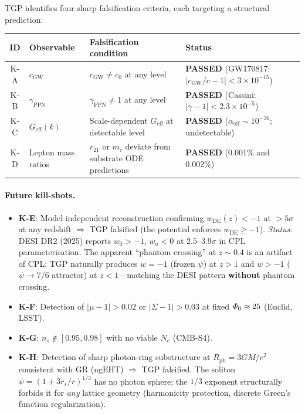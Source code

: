 TGP identifies four sharp falsification criteria, each targeting
a structural prediction:

\begin{center}\small
\begin{tabular}{@{}clp{5.5cm}l@{}}
\toprule
\textbf{ID} & \textbf{Observable} & \textbf{Falsification condition} &
\textbf{Status} \\
\midrule
K-A & $c_{\mathrm{GW}}$
  & $c_{\mathrm{GW}} \neq c_{0}$ at any level
  & \textbf{PASSED} (GW170817: $|c_{\mathrm{GW}}/c-1|<3\times 10^{-15}$) \\[4pt]
K-B & $\gamma_{\mathrm{PPN}}$
  & $\gamma_{\mathrm{PPN}} \neq 1$ at any level
  & \textbf{PASSED} (Cassini: $|\gamma-1|<2.3\times 10^{-5}$) \\[4pt]
K-C & $G_{\mathrm{eff}}(k)$
  & Scale-dependent $G_{\mathrm{eff}}$ at detectable level
  & \textbf{PASSED} ($\alpha_{\mathrm{eff}}\sim 10^{-26}$; undetectable) \\[4pt]
K-D & Lepton mass ratios
  & $r_{21}$ or $m_{\tau}$ deviate from substrate ODE predictions
  & \textbf{PASSED} (0.001\% and 0.002\%) \\
\bottomrule
\end{tabular}
\end{center}

\paragraph{Future kill-shots.}
\begin{itemize}[nosep]
  \item \textbf{K-E}: Model-independent reconstruction confirming
        $w_{\mathrm{DE}}(z)<-1$ at $>5\sigma$ at any redshift
        $\Rightarrow$ TGP falsified
        (the potential enforces $w_{\mathrm{DE}}\geq -1$).
        \emph{Status}: DESI DR2 (2025) reports $w_0 > -1$,
        $w_a < 0$ at $2.5$--$3.9\sigma$ in CPL parameterisation.
        The apparent ``phantom crossing'' at $z \sim 0.4$ is
        an artifact of CPL: TGP naturally produces $w = -1$
        (frozen $\psi$) at $z > 1$ and $w > -1$ ($\psi \to 7/6$
        attractor) at $z < 1$---matching the DESI pattern
        \textbf{without} phantom crossing.
  \item \textbf{K-F}: Detection of $|\mu-1|>0.02$ or
        $|\Sigma-1|>0.03$ at fixed $\varPhi_0\approx 25$
        (Euclid, LSST).
  \item \textbf{K-G}: $n_{s}\notin[0.95,0.98]$ with no viable
        $N_{e}$ (CMB-S4).
  \item \textbf{K-H}: Detection of sharp photon-ring substructure
        at $R_{\mathrm{ph}} = 3GM/c^{2}$ consistent with GR
        (ngEHT) $\Rightarrow$ TGP falsified.  The soliton
        $\psi = (1+3r_{s}/r)^{1/3}$ has no photon sphere; the
        $1/3$ exponent structurally forbids it for \emph{any}
        lattice geometry (harmonicity protection, discrete
        Green's function regularization).
\end{itemize}

